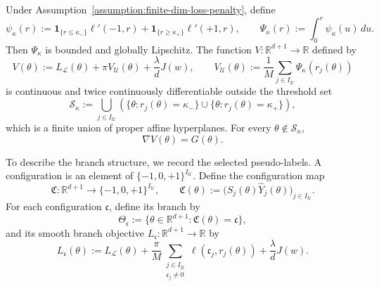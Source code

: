 \begin{proposition}
\label{prop:ST-potential}
Under Assumption~\ref{assumption:finite-dim-loss-penalty}, define
\[
    \psi_\kappa(r)
    :=
    \mathbf1_{\{r\leq\kappa_-\}}\ell'(-1,r)
    +\mathbf1_{\{r\geq\kappa_+\}}\ell'(+1,r),
    \qquad
    \Psi_\kappa(r)
    :=
    \int_0^r\psi_\kappa(u)\,du.
\]
Then $\Psi_\kappa$ is bounded and globally Lipschitz.
The function $V:\mathbb R^{d+1}\to\mathbb R$ defined by
\[
    V(\theta)
    :=
    L_{\mathcal L}(\theta)
    +\pi V_{\mathcal U}(\theta)
    +\frac{\lambda}{d}J(w),
    \qquad
    V_{\mathcal U}(\theta)
    :=
    \frac1M\sum_{j\in I_{\mathcal U}}
        \Psi_\kappa(r_j(\theta))
\]
is continuous and twice continuously differentiable outside
the threshold set
\[
    \mathcal S_\kappa
    :=
    \bigcup_{j\in I_{\mathcal U}}
    \left(
        \{\theta:r_j(\theta)=\kappa_-\}
        \cup
        \{\theta:r_j(\theta)=\kappa_+\}
    \right),
\]
which is a finite union of proper affine hyperplanes. For every
$\theta\notin\mathcal S_\kappa$,
\[
    \nabla V(\theta)=G(\theta).
\]
\end{proposition}

To describe the branch structure, we record the selected
pseudo-labels.
A configuration is an element of
$\{-1,0,+1\}^{I_{\mathcal U}}$.
Define the configuration map
\[
    \mathfrak C:\mathbb R^{d+1}\to\{-1,0,+1\}^{I_{\mathcal U}}, \qquad 
    \mathfrak C(\theta)
    :=
    \bigl(S_j(\theta)\hat Y_j(\theta)\bigr)_{j\in I_{\mathcal U}}.
\]
For each configuration $\mathfrak c$, define its branch by
\[
    \Theta_{\mathfrak c}
    :=
    \{\theta\in\mathbb R^{d+1}:
        \mathfrak C(\theta)=\mathfrak c\},
\]
and its smooth branch objective
$L_{\mathfrak c}:\mathbb R^{d+1}\to\mathbb R$ by
\[
    L_{\mathfrak c}(\theta)
    :=
    L_{\mathcal L}(\theta)
    +
    \frac{\pi}{M}
    \sum_{\substack{j\in I_{\mathcal U}\\\mathfrak c_j\neq0}}
        \ell(\mathfrak c_j,r_j(\theta))
    +
    \frac{\lambda}{d}J(w).
\]

